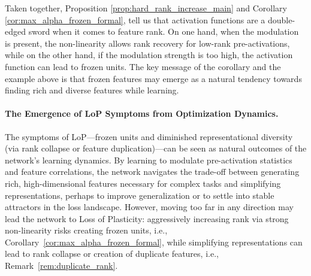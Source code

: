 \documentclass{article}
\newcommand{\GIU}[1]{\todo[color=purple!30,size=\tiny]{GIU: #1}}
\numberwithin{figure}{section}
\begin{document}
Taken together, Proposition \ref{prop:hard_rank_increase_main} and Corollary \ref{cor:max_alpha_frozen_formal}, tell us that activation functions are a double-edged sword when it comes to feature rank. On one hand, when the modulation is present, the non-linearity allows rank recovery for low-rank pre-activations, while on the other hand, if the modulation strength  is too high, the activation function can lead to frozen units.   
The key message of the corollary and the example above is  that frozen features may emerge as a natural tendency towards finding rich and diverse features while learning. 

\paragraph{The Emergence of LoP Symptoms from Optimization Dynamics.} The symptoms of LoP---frozen units and diminished representational diversity (via rank collapse or feature duplication)---can be seen as natural outcomes of the network's learning dynamics. By learning to modulate pre-activation statistics and feature correlations, the network navigates the trade-off between generating rich, high-dimensional features necessary for complex tasks and simplifying representations, perhaps to improve generalization or to settle into stable attractors in the loss landscape.  However, moving too far in any direction may lead the network to Loss of Plasticity: aggressively increasing rank via strong non-linearity risks creating frozen units, i.e., Corollary~\ref{cor:max_alpha_frozen_formal}, while simplifying representations can lead to rank collapse or creation of duplicate features, i.e., Remark~\ref{rem:duplicate_rank}.
\end{document}
